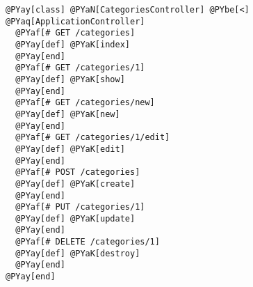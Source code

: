\begin{Verbatim}[commandchars=@\[\]]
@PYay[class] @PYaN[CategoriesController] @PYbe[<] @PYaq[ApplicationController]
  @PYaf[# GET /categories]
  @PYay[def] @PYaK[index]
  @PYay[end]
  @PYaf[# GET /categories/1]
  @PYay[def] @PYaK[show]
  @PYay[end]
  @PYaf[# GET /categories/new]
  @PYay[def] @PYaK[new]
  @PYay[end]
  @PYaf[# GET /categories/1/edit]
  @PYay[def] @PYaK[edit]
  @PYay[end]
  @PYaf[# POST /categories]
  @PYay[def] @PYaK[create]
  @PYay[end]
  @PYaf[# PUT /categories/1]
  @PYay[def] @PYaK[update]
  @PYay[end]
  @PYaf[# DELETE /categories/1]
  @PYay[def] @PYaK[destroy]
  @PYay[end]
@PYay[end]
\end{Verbatim}
